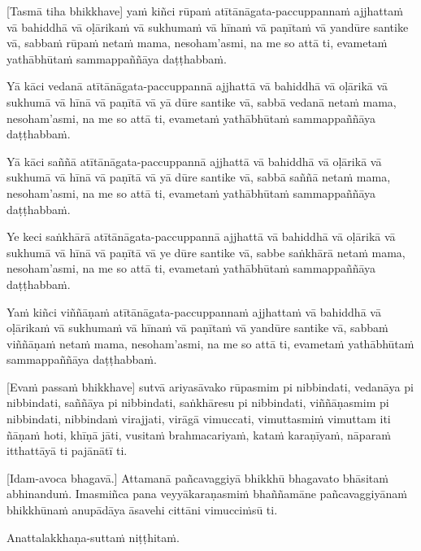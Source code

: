 [Tasmā tiha bhikkhave] yaṁ kiñci rūpaṁ atītānāgata-paccuppannaṁ ajjhattaṁ
vā bahiddhā vā oḷārikaṁ vā sukhumaṁ vā hīnaṁ vā paṇītaṁ vā yandūre
santike vā, sabbaṁ rūpaṁ netaṁ mama, nesoham'asmi, na me so attā ti,
evametaṁ yathābhūtaṁ sammappaññāya daṭṭhabbaṁ.

Yā kāci vedanā atītānāgata-paccuppannā ajjhattā vā bahiddhā vā oḷārikā
vā sukhumā vā hīnā vā paṇītā vā yā dūre santike vā, sabbā vedanā netaṁ
mama, nesoham'asmi, na me so attā ti, evametaṁ yathābhūtaṁ sammappaññāya
daṭṭhabbaṁ.

Yā kāci saññā atītānāgata-paccuppannā ajjhattā vā bahiddhā vā oḷārikā vā
sukhumā vā hīnā vā paṇītā vā yā dūre santike vā, sabbā saññā netaṁ mama,
nesoham'asmi, na me so attā ti, evametaṁ yathābhūtaṁ sammappaññāya
daṭṭhabbaṁ.

Ye keci saṅkhārā atītānāgata-paccuppannā ajjhattā vā bahiddhā vā oḷārikā
vā sukhumā vā hīnā vā paṇītā vā ye dūre santike vā, sabbe saṅkhārā netaṁ
mama, nesoham'asmi, na me so attā ti, evametaṁ yathābhūtaṁ sammappaññāya
daṭṭhabbaṁ.

Yaṁ kiñci viññāṇaṁ atītānāgata-paccuppannaṁ ajjhattaṁ vā bahiddhā vā
oḷārikaṁ vā sukhumaṁ vā hīnaṁ vā paṇītaṁ vā yandūre santike vā, sabbaṁ
viññāṇaṁ netaṁ mama, nesoham'asmi, na me so attā ti, evametaṁ yathābhūtaṁ
sammappaññāya daṭṭhabbaṁ.

[Evaṁ passaṁ bhikkhave] sutvā ariyasāvako rūpasmim pi nibbindati, vedanāya
pi nibbindati, saññāya pi nibbindati, saṅkhāresu pi nibbindati,
viññāṇasmim pi nibbindati, nibbindaṁ virajjati, virāgā vimuccati,
vimuttasmiṁ vimuttam iti ñāṇaṁ hoti, khīṇā jāti, vusitaṁ brahmacariyaṁ,
kataṁ karaṇīyaṁ, nāparaṁ itthattāyā ti pajānātī ti.

[Idam-avoca bhagavā.] Attamanā pañcavaggiyā bhikkhū bhagavato bhāsitaṁ
abhinanduṁ. Imasmiñca pana veyyākaraṇasmiṁ bhaññamāne pañcavaggiyānaṁ
bhikkhūnaṁ anupādāya āsavehi cittāni vimucciṁsū ti.

Anattalakkhaṇa-suttaṁ niṭṭhitaṁ.


